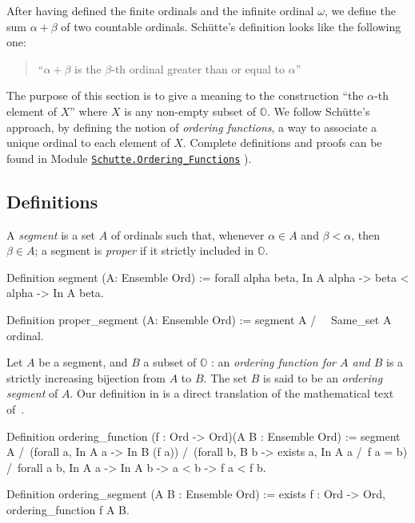 {After having defined the finite ordinals and the infinite ordinal $\omega$, we  define the sum $\alpha+\beta$ of two countable ordinals.
Schütte's definition looks like the following one:

\begin{quote}
``$\alpha+\beta$ is the $\beta$-th ordinal greater than or equal to $\alpha$''
\end{quote}


The purpose of this section is to give a meaning to the construction
``the $\alpha$-th element of $X$''  where $X$ is any non-empty subset of $\mathbb{O}$.
We follow Schütte's approach, by defining the notion of \emph{ordering functions},
a way to associate a unique ordinal to each element of $X$.
Complete definitions and proofs can be found in Module
 \href{../theories/html/hydras.Schutte.Ordering_Functions.html}%
{\texttt{Schutte.Ordering\_Functions}} ).

\subsection{Definitions}

A \emph{segment} is a set $A$ of ordinals such that, whenever  $\alpha\in A$ and
$\beta<\alpha$, then $\beta\in A$; a segment is  \emph{proper} if it strictly included in $\mathbb{O}$.

\begin{Coqsrc}
 Definition segment (A: Ensemble Ord) :=
  forall alpha beta, In A alpha -> beta < alpha -> In A  beta.

Definition proper_segment (A: Ensemble Ord) :=
  segment A /\ ~ Same_set A ordinal.
\end{Coqsrc}


Let  $A$ be a segment, and $B$ a subset of $\mathbb{O}$ : an \emph{ordering function for $A$ and  $B$} is a strictly increasing bijection from $A$ to $B$.
The set $B$ is said to be an \emph{ordering segment} of $A$.
Our definition in \coq{} is a direct translation of the mathematical text of~\cite{schutte}.


\begin{Coqsrc}
Definition ordering_function (f : Ord -> Ord)(A B : Ensemble Ord) :=
 segment A /\
 (forall a, In A a -> In B (f a)) /\
 (forall b, B b -> exists a, In A a /\ f a = b) /\
 forall a b, In A a -> In A b -> a < b ->  f a < f b.

Definition ordering_segment (A B : Ensemble Ord) :=
  exists f : Ord -> Ord, ordering_function f A B.
\end{Coqsrc}


}
